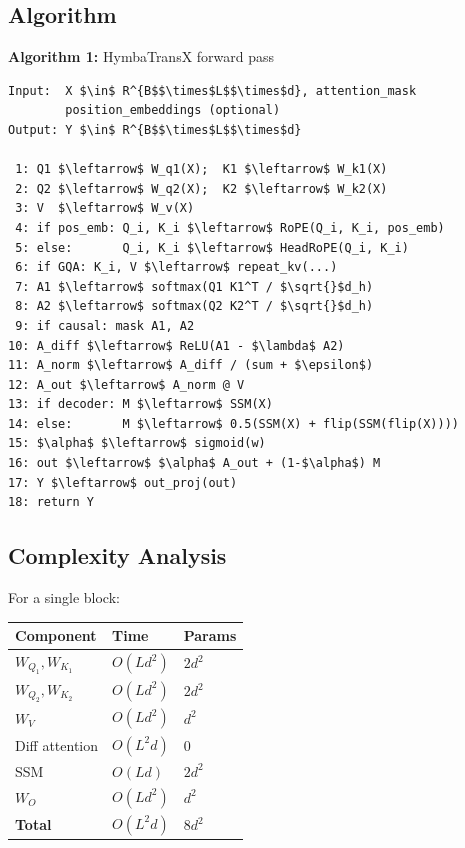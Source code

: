 \subsection{Algorithm}

\textbf{Algorithm 1:} HymbaTransX forward pass
\begin{lstlisting}
Input:  X $\in$ R^{B$$\times$L$$\times$d}, attention_mask
        position_embeddings (optional)
Output: Y $\in$ R^{B$$\times$L$$\times$d}

 1: Q1 $\leftarrow$ W_q1(X);  K1 $\leftarrow$ W_k1(X)
 2: Q2 $\leftarrow$ W_q2(X);  K2 $\leftarrow$ W_k2(X)
 3: V  $\leftarrow$ W_v(X)
 4: if pos_emb: Q_i, K_i $\leftarrow$ RoPE(Q_i, K_i, pos_emb)
 5: else:       Q_i, K_i $\leftarrow$ HeadRoPE(Q_i, K_i)
 6: if GQA: K_i, V $\leftarrow$ repeat_kv(...)
 7: A1 $\leftarrow$ softmax(Q1 K1^T / $\sqrt{}$d_h)
 8: A2 $\leftarrow$ softmax(Q2 K2^T / $\sqrt{}$d_h)
 9: if causal: mask A1, A2
10: A_diff $\leftarrow$ ReLU(A1 - $\lambda$ A2)
11: A_norm $\leftarrow$ A_diff / (sum + $\epsilon$)
12: A_out $\leftarrow$ A_norm @ V
13: if decoder: M $\leftarrow$ SSM(X)
14: else:       M $\leftarrow$ 0.5(SSM(X) + flip(SSM(flip(X))))
15: $\alpha$ $\leftarrow$ sigmoid(w)
16: out $\leftarrow$ $\alpha$ A_out + (1-$\alpha$) M
17: Y $\leftarrow$ out_proj(out)
18: return Y
\end{lstlisting}

\subsection{Complexity Analysis}

For a single block:

\begin{table}[H]
\centering
\small
\begin{tabular}{lll}
\toprule
\textbf{Component} & \textbf{Time} & \textbf{Params} \\
\midrule
$W_{Q_1}, W_{K_1}$ & $O(L d^2)$ & $2 d^2$ \\
$W_{Q_2}, W_{K_2}$ & $O(L d^2)$ & $2 d^2$ \\
$W_V$ & $O(L d^2)$ & $d^2$ \\
Diff attention & $O(L^2 d)$ & 0 \\
SSM & $O(L d)$ & $2 d^2$ \\
$W_O$ & $O(L d^2)$ & $d^2$ \\
\textbf{Total} & $O(L^2 d)$ & $8 d^2$ \\
\bottomrule
\end{tabular}
\end{table}

